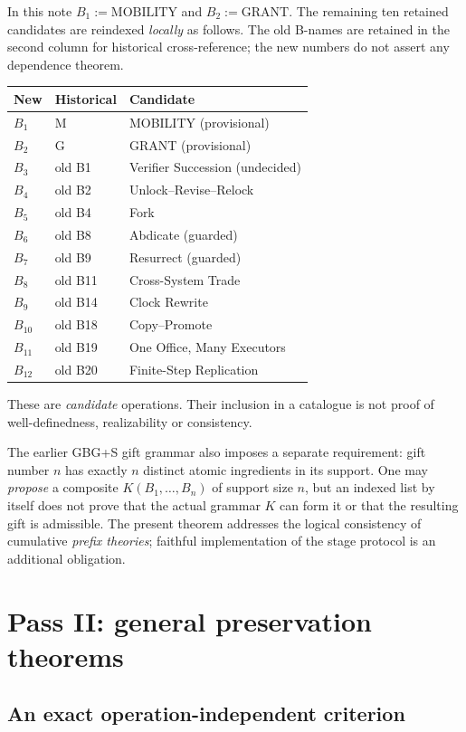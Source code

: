 \documentclass[11pt,letterpaper]{article}
\theoremstyle{definition}
\begin{document}
In this note \(B_1:=\mathrm{MOBILITY}\) and \(B_2:=\mathrm{GRANT}\). The remaining ten retained candidates are reindexed \emph{locally} as follows. The old B-names are retained in the second column for historical cross-reference; the new numbers do not assert any dependence theorem.
\begin{center}
\small
\begin{tabular}{@{}>{\bfseries}l l p{3.55in}@{}}
\toprule
New & Historical & Candidate \\
\midrule
\(B_1\) & M & MOBILITY (provisional) \\
\(B_2\) & G & GRANT (provisional) \\
\(B_3\) & old B1 & Verifier Succession (undecided) \\
\(B_4\) & old B2 & Unlock--Revise--Relock \\
\(B_5\) & old B4 & Fork \\
\(B_6\) & old B8 & Abdicate (guarded) \\
\(B_7\) & old B9 & Resurrect (guarded) \\
\(B_8\) & old B11 & Cross-System Trade \\
\(B_9\) & old B14 & Clock Rewrite \\
\(B_{10}\) & old B18 & Copy--Promote \\
\(B_{11}\) & old B19 & One Office, Many Executors \\
\(B_{12}\) & old B20 & Finite-Step Replication \\
\bottomrule
\end{tabular}
\end{center}
These are \emph{candidate} operations. Their inclusion in a catalogue is not proof of well-definedness, realizability or consistency.

The earlier GBG+S gift grammar also imposes a separate requirement: gift number \(n\) has exactly \(n\) distinct atomic ingredients in its support. One may \emph{propose} a composite \(K(B_1,\dots,B_n)\) of support size \(n\), but an indexed list by itself does not prove that the actual grammar \(K\) can form it or that the resulting gift is admissible. The present theorem addresses the logical consistency of cumulative \emph{prefix theories}; faithful implementation of the stage protocol is an additional obligation.

\section{Pass II: general preservation theorems}
\subsection{An exact operation-independent criterion}
\end{document}
